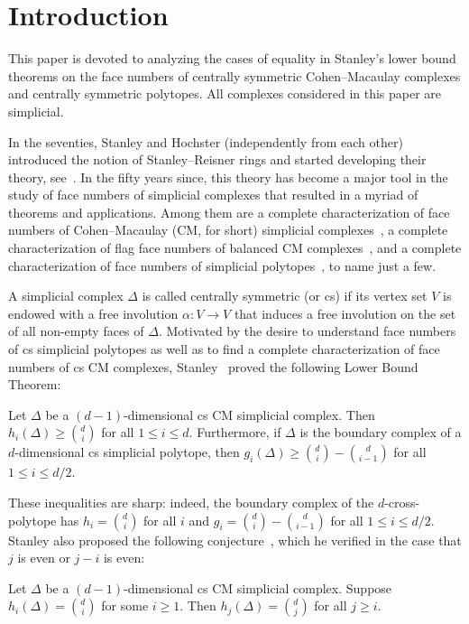 \section{Introduction}
This paper is devoted to analyzing the cases of equality in Stanley's lower bound theorems on the face numbers of centrally symmetric Cohen--Macaulay complexes and centrally symmetric polytopes. All complexes considered in this paper are simplicial.

In the seventies, Stanley and Hochster (independently from each other) introduced the notion of Stanley--Reisner rings and started developing their theory, see~\cite{Hochster, Reisner, Stanley75, Stanley77}. In the fifty years since, this theory has become a major tool in the study of face numbers of simplicial complexes that resulted in a myriad of theorems and applications. Among them are a complete characterization of face numbers of Cohen--Macaulay (CM, for short) simplicial complexes~\cite{Stanley77}, a complete characterization of flag face numbers of balanced CM complexes~\cite{BjorFranklSta,Stanley79}, and a complete characterization of face numbers of simplicial polytopes~\cite{BilleraLee, Stanley80}, to name just a few.

A simplicial complex $\Delta$ is called centrally symmetric (or cs) if its vertex set $V$ is endowed with a free involution $\alpha: V \to V$ that induces a free involution on the set of all non-empty faces of $\Delta$. Motivated by the desire to understand face numbers of cs simplicial polytopes as well as to find a complete characterization of face numbers of cs CM complexes, Stanley~\cite[Theorems 3.1 and 4.1]{Stanley-87} proved the following Lower Bound Theorem:
\begin{theorem} \label{Stanley-LBT-v1}
	Let $\Delta$ be a $(d-1)$-dimensional cs CM simplicial complex. Then $h_i(\Delta)\geq \binom{d}{i}$ for all $1\leq i\leq d$. Furthermore, if $\Delta$ is the boundary complex of a $d$-dimensional cs simplicial polytope, then $g_i(\Delta)\geq \binom{d}{i}-\binom{d}{i-1}$ for all $1\leq i\leq d/2$.
\end{theorem}
\noindent These inequalities are sharp: indeed, the boundary complex of the $d$-cross-polytope has $h_i=\binom{d}{i}$ for all $i$ and $g_i=\binom{d}{i}-\binom{d}{i-1}$ for all $1\leq i\leq d/2$. Stanley also proposed the following conjecture~\cite[Conjecture 3.5]{Stanley-87}, which he verified in the case that $j$ is even or $j-i$ is even:
\begin{conjecture}\label{conj}
	Let $\Delta$ be a $(d-1)$-dimensional cs CM simplicial complex. Suppose $h_i(\Delta)=\binom{d}{i}$ for some $i\geq 1$. Then $h_j(\Delta)=\binom{d}{j}$ for all $j\geq i$.
\end{conjecture}

